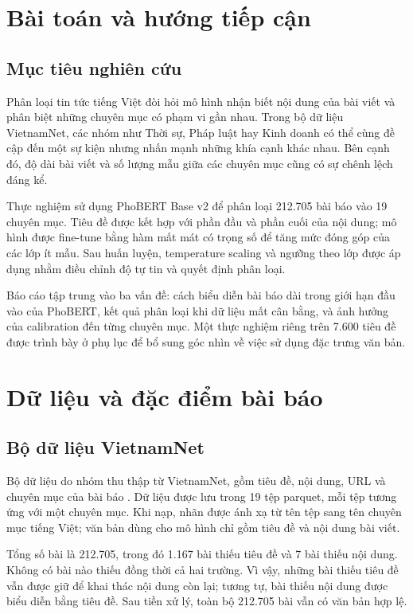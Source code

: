 \chapter{Bài toán và hướng tiếp cận}
\section{Mục tiêu nghiên cứu}
Phân loại tin tức tiếng Việt đòi hỏi mô hình nhận biết nội dung của bài viết và phân biệt những chuyên mục có phạm vi gần nhau. Trong bộ dữ liệu VietnamNet, các nhóm như Thời sự, Pháp luật hay Kinh doanh có thể cùng đề cập đến một sự kiện nhưng nhấn mạnh những khía cạnh khác nhau. Bên cạnh đó, độ dài bài viết và số lượng mẫu giữa các chuyên mục cũng có sự chênh lệch đáng kể.

Thực nghiệm sử dụng PhoBERT Base v2 để phân loại 212.705 bài báo vào 19 chuyên mục. Tiêu đề được kết hợp với phần đầu và phần cuối của nội dung; mô hình được fine-tune bằng hàm mất mát có trọng số để tăng mức đóng góp của các lớp ít mẫu. Sau huấn luyện, temperature scaling và ngưỡng theo lớp được áp dụng nhằm điều chỉnh độ tự tin và quyết định phân loại.

Báo cáo tập trung vào ba vấn đề: cách biểu diễn bài báo dài trong giới hạn đầu vào của PhoBERT, kết quả phân loại khi dữ liệu mất cân bằng, và ảnh hưởng của calibration đến từng chuyên mục. Một thực nghiệm riêng trên 7.600 tiêu đề được trình bày ở phụ lục để bổ sung góc nhìn về việc sử dụng đặc trưng văn bản.

\chapter{Dữ liệu và đặc điểm bài báo}
\section{Bộ dữ liệu VietnamNet}
Bộ dữ liệu do nhóm thu thập từ VietnamNet, gồm tiêu đề, nội dung, URL và chuyên mục của bài báo \cite{vietnamnet}. Dữ liệu được lưu trong 19 tệp parquet, mỗi tệp tương ứng với một chuyên mục. Khi nạp, nhãn được ánh xạ từ tên tệp sang tên chuyên mục tiếng Việt; văn bản dùng cho mô hình chỉ gồm tiêu đề và nội dung bài viết.

Tổng số bài là 212.705, trong đó 1.167 bài thiếu tiêu đề và 7 bài thiếu nội dung. Không có bài nào thiếu đồng thời cả hai trường. Vì vậy, những bài thiếu tiêu đề vẫn được giữ để khai thác nội dung còn lại; tương tự, bài thiếu nội dung được biểu diễn bằng tiêu đề. Sau tiền xử lý, toàn bộ 212.705 bài vẫn có văn bản hợp lệ.


